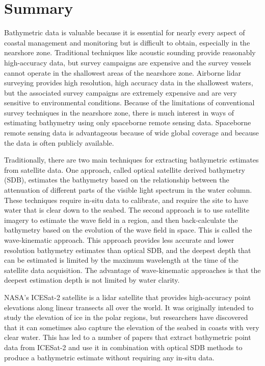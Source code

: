 \chapter*{Summary}

Bathymetric data is valuable because it is essential for nearly every aspect of coastal management and monitoring but is difficult to obtain, especially in the nearshore zone. Traditional techniques like acoustic sounding provide reasonably high-accuracy data, but survey campaigns are expensive and the survey vessels cannot operate in the shallowest areas of the nearshore zone. Airborne lidar surveying provides high resolution, high accuracy data in the shallowest waters, but the associated survey campaigns are extremely expensive and are very sensitive to environmental conditions. Because of the limitations of conventional survey techniques in the nearshore zone, there is much interest in ways of estimating bathymetry using only spaceborne remote sensing data. Spaceborne remote sensing data is advantageous because of wide global coverage and because the data is often publicly available.
\vskip 0.1in

Traditionally, there are two main techniques for extracting bathymetric estimates from satellite data. One approach, called optical satellite derived bathymetry (SDB), estimates the bathymetry based on the relationship between the attenuation of different parts of the visible light spectrum in the water column. These techniques require in-situ data to calibrate, and require the site to have water that is clear down to the seabed. The second approach is to use satellite imagery to estimate the wave field in a region, and then back-calculate the bathymetry based on the evolution of the wave field in space. This is called the wave-kinematic approach. This approach provides less accurate and lower resolution bathymetry estimates than optical SDB, and the deepest depth that can be estimated is limited by the maximum wavelength at the time of the satellite data acquisition. The advantage of wave-kinematic approaches is that the deepest estimation depth is not limited by water clarity.
\vskip 0.1in

NASA's ICESat-2 satellite is a lidar satellite that provides high-accuracy point elevations along linear transects all over the world. It was originally intended to study the elevation of ice in the polar regions, but researchers have discovered that it can sometimes also capture the elevation of the seabed in coasts with very clear water. This has led to a number of papers that extract bathymetric point data from ICESat-2 and use it in combination with optical SDB methods to produce a bathymetric estimate without requiring any in-situ data.  
\vskip 0.1in

